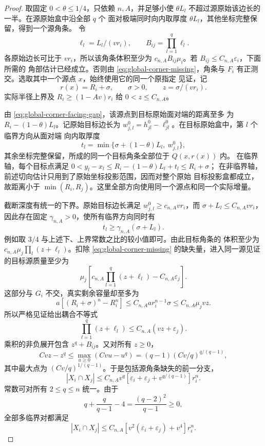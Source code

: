 \begin{proof}
取固定 \(0<\theta\le1/4\)，只依赖 \(n,A\)，并足够小使
\(\theta L_l\) 不超过源原始该边长的一半。在源原始盒中沿全部 \(q\) 个
面对极端同时向内取厚度 \(\theta L_l\)，其他坐标完整保留，得到一个源角条。
令
\[
 \ell_l=L_l/(vr_i),\qquad B_{ij}=\prod_{l=1}^q\ell_l.
\]
各原始边长可比于 \(vr_i\)，所以该角条体积至少为
\(c_{n,A}B_{ij}\mu_i\)。若 \(B_{ij}\le C_{n,A}\varepsilon_i\)，下面所需的
角部估计已经成立。否则由 \eqref{eq:global-corner-missing}，角条与
\(F_i\) 有正测交。选取其中一个源点 \(x\)，始终使用它的同一个原指定
见证，记
\begin{equation}\label{eq:global-corner-actual-increment}
 r(x)=R_i+\sigma,\qquad \sigma>0,\qquad z=\sigma/(vr_i).
\end{equation}
实际半径上界及 \(R_i\ge(1-Av)r_i\) 给 \(0<z\le C_{n,A}\)。

由 \eqref{eq:global-corner-facing-gap}，该源点到目标原始面对端的距离至多
为 \(R_i-(1-\theta)L_l\)。记原始目标边长为
\(w_{j,l}^0=h_{jl}^0-\ell_{jl}^0\)。在目标原始盒中，第 \(l\) 个临界方向从面对端
向内取厚度
\begin{equation}\label{eq:global-corner-truncated-depth}
 t_l=\min\{\sigma+(1-\theta)L_l,\ w_{j,l}^0\},
\end{equation}
其余坐标完整保留，所成的同一个目标角条全部位于 \(Q(x,r(x))\) 内。
在临界轴，每个目标点满足
\(0<y_l-x_l\le R_i-(1-\theta)L_l+t_l\le R_i+\sigma\)；
在非临界轴，前述切向估计只用到了原始坐标投影范围，因而对整个原始
目标投影盒都成立，故距离小于
\(\min(R_i,R_j)\)。这里全部方向使用同一个源点和同一个实际增量。

截断深度有统一的下界。原始目标边长满足
\(w_{j,l}^0\ge c_{n,A}vr_i\)，而 \(\sigma+L_l\le C_{n,A}vr_i\)，
因此存在固定 \(\gamma_{n,A}>0\)，使所有临界方向同时有
\[
 t_l\ge\gamma_{n,A}(\sigma+L_l).
\]
例如取 \(3/4\) 与上述下、上界常数之比的较小值即可。由此目标角条的
体积至少为 \(c_{n,A}\mu_j\prod_l(z+\ell_l)\)。扣除
\eqref{eq:global-corner-missing} 的缺失量，进入同一源见证的目标源质量至少为
\[
 \mu_j\left[c_{n,A}\prod_{l=1}^q(z+\ell_l)-C_{n,A}\varepsilon_j\right].
\]
这部分与 \(G_i\) 不交，真实剩余容量却至多为
\[
 a[(R_i+\sigma)^n-R_i^n]
 \le C_{n,A}ar_i^{n-1}\sigma\le C_{n,A}\mu_j vz.
\]
所以严格见证给出耦合不等式
\begin{equation}\label{eq:global-corner-coupled-capacity}
 \prod_{l=1}^q(z+\ell_l)\le C_{n,A}(vz+\varepsilon_j).
\end{equation}
乘积的非负展开包含 \(z^q+B_{ij}\)。又对所有 \(z\ge0\)，
\[
 Cvz-z^q\le\max_{u\ge0}(Cvu-u^q)
 =(q-1)(Cv/q)^{q/(q-1)},
\]
其中最大点为 \((Cv/q)^{1/(q-1)}\)。于是包括源角条缺失的前一分支，
\begin{equation}\label{eq:global-corner-q-overlap}
 |X_i\cap X_j|\le C_{n,A}v^q
       [\varepsilon_i+\varepsilon_j+v^{q/(q-1)}]r_i^n.
\end{equation}
常数可对所有 \(2\le q\le n\) 统一。由于
\[
 q+\frac q{q-1}-4=\frac{(q-2)^2}{q-1}\ge0,
\]
全部多临界对都满足
\begin{equation}\label{eq:global-corner-overlap}
 |X_i\cap X_j|\le C_{n,A}
       [v^2(\varepsilon_i+\varepsilon_j)+v^4]r_i^n.
\end{equation}


\end{proof}
